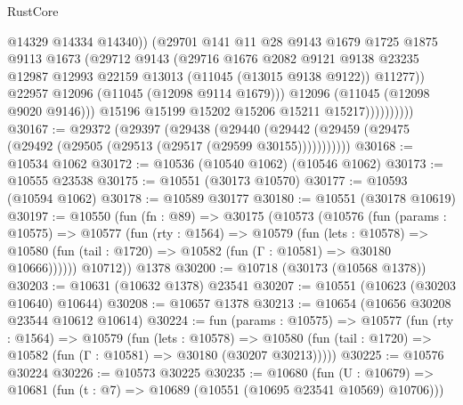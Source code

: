 \begin{lexlean}{RustCore}
\begin{coremodule}
                              @14329
                              @14334
                              @14340))
                          (@29701
                            @141
                            @11
                            @28
                            @9143
                            @1679
                            @1725
                            @1875
                            @9113
                            @1673
                            (@29712
                              @9143
                              (@29716
                                @1676
                                @2082
                                @9121
                                @9138
                                @23235
                                @12987
                                @12993
                                @22159
                                @13013
                                (@11045 (@13015 @9138 @9122))
                                @11277))
                            @22957
                            @12096
                            (@11045 (@12098 @9114 @1679)))
                          @12096
                          (@11045 (@12098 @9020 @9146)))
                        @15196
                        @15199
                        @15202
                        @15206
                        @15211
                        @15217))))))))))
@30167 := @29372
    (@29397
      (@29438
        (@29440 (@29442 (@29459 (@29475 (@29492 (@29505 (@29513 (@29517 (@29599 @30155)))))))))))
@30168 := @10534 @1062
@30172 := @10536 (@10540 @1062) (@10546 @1062)
@30173 := @10555 @23538
@30175 := @10551 (@30173 @10570)
@30177 := @10593 (@10594 @1062)
@30178 := @10589 @30177
@30180 := @10551 (@30178 @10619)
@30197 := @10550
    (fun (fn : @89) =>
    @30175
      (@10573
        (@10576
          (fun (params : @10575) =>
          @10577
            (fun (rty : @1564) =>
            @10579
              (fun (lets : @10578) =>
              @10580 (fun (tail : @1720) => @10582 (fun (Γ : @10581) => @30180 @10666))))))
        @10712))
    @1378
@30200 := @10718 (@30173 (@10568 @1378))
@30203 := @10631 (@10632 @1378) @23541
@30207 := @10551 (@10623 (@30203 @10640) @10644)
@30208 := @10657 @1378
@30213 := @10654 (@10656 @30208 @23544 @10612 @10614)
@30224 := fun (params : @10575) =>
  @10577
    (fun (rty : @1564) =>
    @10579
      (fun (lets : @10578) =>
      @10580 (fun (tail : @1720) => @10582 (fun (Γ : @10581) => @30180 (@30207 @30213)))))
@30225 := @10576 @30224
@30226 := @10573 @30225
@30235 := @10680
    (fun (U : @10679) => @10681 (fun (t : @7) => @10689 (@10551 (@10695 @23541 @10569) @10706)))

\end{coremodule}
\end{lexlean}
